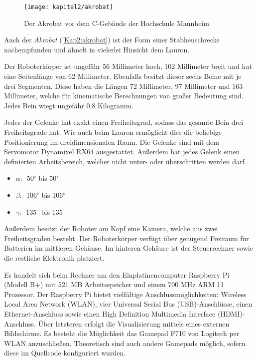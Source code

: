 \begin{figure}[b!]
  \centering
  \texttt{[image: kapitel2/akrobat]}
  \caption{Der Akrobat vor dem C-Gebäude der Hochschule Mannheim}
  \label{Kap2:akrobat}
\end{figure}

Auch der \emph{Akrobat} (\autoref{Kap2:akrobat}) ist der Form einer Stabheuschrecke nachempfunden und ähnelt in vielerlei Hinsicht dem Lauron.

Der Roboterkörper ist ungefähr 56 Millimeter hoch, 102 Millimeter breit und hat eine Seitenlänge von 62 Millimeter. Ebenfalls besitzt dieser sechs Beine mit je drei Segmenten. Diese haben die Längen 72 Millimeter, 97 Millimeter und 163 Millimeter, welche für kinematische Berechnungen von großer Bedeutung sind. Jedes Bein wiegt ungefähr 0,8 Kilogramm.

Jedes der Gelenke hat exakt einen Freiheitsgrad, sodass das gesamte Bein drei Freiheitsgrade hat. Wie auch beim Lauron ermöglicht dies die beliebige Positionierung im dreidimensionalen Raum. Die Gelenke sind mit dem Servomotor Dynamixel RX64 ausgestattet. Außerdem hat jedes Gelenk einen definierten Arbeitsbereich, welcher nicht unter- oder überschritten werden darf.
\begin{itemize}
  \item $\alpha$: -50$^\circ$ bis 50$^\circ$
  \item $\beta$: -106$^\circ$ bis 106$^\circ$
  \item $\gamma$: -135$^\circ$ bis 135$^\circ$
\end{itemize}  

Außerdem besitzt der Roboter am Kopf eine Kamera, welche aus zwei Freiheitsgraden besteht. Der Roboterkörper verfügt über genügend Freiraum für Batterien im mittleren Gehäuse. Im hinteren Gehäuse ist der Steuerrechner sowie die restliche Elektronik platziert.

Es handelt sich beim Rechner um den Einplatinencomputer Raspberry Pi (Modell B+) mit 521 MB Arbeitsspeicher und einem 700 MHz ARM 11 Prozessor. Der Raspberry Pi bietet vielfältige Anschlussmöglichkeiten: Wireless Local Area Network (WLAN), vier Universal Serial Bus (USB)-Anschlüsse, einen Ethernet-Anschluss sowie einen High Definition Multimedia Interface (HDMI)-Anschluss. Über letzteren erfolgt die Visualisierung mittels eines externen Bildschirms. Es besteht die Möglichkeit das Gamepad F710 von Logitech per WLAN anzuschließen. Theoretisch sind auch andere Gamepads möglich, sofern diese im Quellcode konfiguriert wurden. \autocite{askerow2014}

